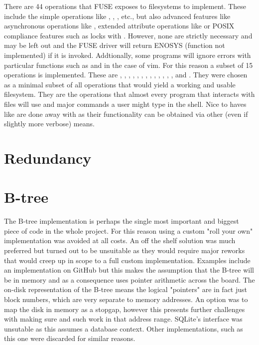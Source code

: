         There are 44 operations that FUSE exposes to filesystems to implement.
        These include the simple operations like ,
        , , etc., but also advanced features like
        asynchronous operations like , extended attribute
        operations like  or POSIX compliance features such as
        locks with . However, none are strictly necessary and
        may be left out and the FUSE driver will return ENOSYS (function not
        implemented) if it is invoked. Addtionally, some programs will ignore
        errors with particular functions such as  and
         in the case of vim. For this reason a subset of 15
        operations is implemented. These are  ,
        , , , ,
        , , , ,
        , , , ,
         and . They were chosen as a minimal
        subset of all operations that would yield a working and usable
        filesystem. They are the operations that almost every program that
        interacts with files will use and major commands a user might type in
        the shell. Nice to haves like  are done away with as
        their functionality can be obtained via other (even if slightly more
        verbose) means.

    \section{Redundancy}

    \section{B-tree}

        The B-tree implementation is perhaps the single most important and
        biggest piece of code in the whole project. For this reason using a
        custom "roll your own" implementation was avoided at all costs. An off
        the shelf solution was much preferred but turned out to be unsuitable
        as they would require major reworks that would creep up in scope to a
        full custom implementation. Examples include an implementation on
        GitHub \cite{GitHub_btree} but this makes the assumption that the
        B-tree will be in memory and as a consequence uses pointer arithmetic
        across the board. The on-disk representation of the B-tree means the
        logical "pointers" are in fact just block numbers, which are very
        separate to memory addresses. An option was to map the disk in memory
        as a stopgap, however this presents further challenges with making sure
         and such work in that address range.  SQLite's
        interface \cite{SQLite_btree} was unsutable as this assumes a database
        context. Other implementations, such as this one \cite{random_btree}
        were discarded for similar reasons.

